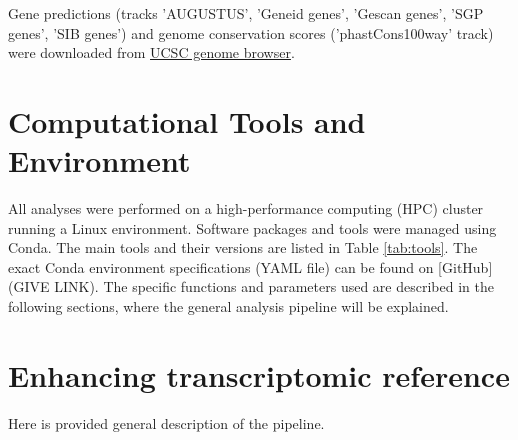 Gene predictions (tracks 'AUGUSTUS', 'Geneid genes', 'Gescan genes', 'SGP genes', 'SIB genes') and 
genome conservation scores ('phastCons100way' track) were downloaded from \href{https://genome.ucsc.edu/}{UCSC genome browser}.

\section{Computational Tools and Environment}

All analyses were performed on a high-performance computing (HPC) cluster running a Linux environment.
Software packages and tools were managed using Conda.
The main tools and their versions are listed in Table \ref{tab:tools}.
The exact Conda environment specifications (YAML file) can be found on [GitHub](GIVE LINK).
The specific functions and parameters used are described in the following sections, where the general analysis pipeline will be explained.



\section{Enhancing transcriptomic reference}

Here is provided general description of the pipeline.


